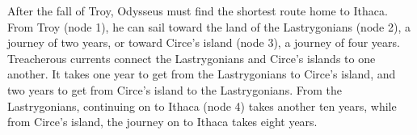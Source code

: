 \documentclass[11pt]{article}
\begin{document}



\noindent After the fall of Troy, Odysseus must find the shortest route home to Ithaca.
From Troy (node 1), he can sail toward the land of the Lastrygonians (node 2), a journey of two years, or toward Circe's island (node 3), a journey of four years. 
Treacherous currents connect the Lastrygonians and Circe's islands to one another. 
It takes one year to get from the Lastrygonians to Circe's island, and two years to get from Circe's island to the Lastrygonians.
From the Lastrygonians, continuing on to Ithaca (node 4) takes another ten years, while from Circe's island, the journey on to Ithaca takes eight years.
\end{document}
